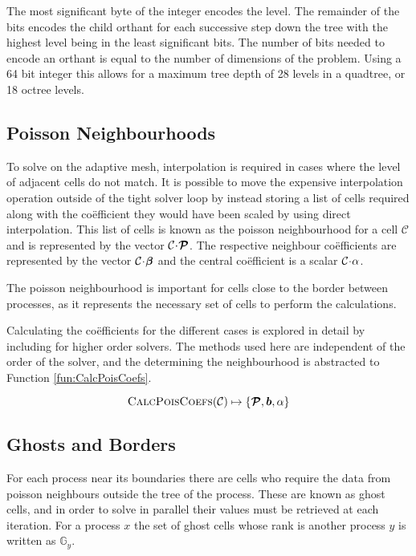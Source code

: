 \documentclass{IIBproject}
\newcommand{\vect}[1]{\bm{#1}}
\newcommand{\acc}{{\mkern 0.5mu\cdot\mkern 0.5mu}}
\begin{document}
The most significant byte of the integer encodes the level. The remainder of the bits encodes the child orthant for each successive step down the tree with the highest level being in the least significant bits. The number of bits needed to encode an orthant is equal to the number of dimensions of the problem. Using a 64 bit integer this allows for a maximum tree depth of 28 levels in a quadtree, or 18 octree levels. 


\subsection{Poisson Neighbourhoods}

To solve on the adaptive mesh, interpolation is required in cases where the level of adjacent cells do not match. It is possible to move the expensive interpolation operation outside of the tight solver loop by instead storing a list of cells required along with the co\"efficient they would have been scaled by using direct interpolation. This list of cells is known as the poisson neighbourhood for a cell $\mathcal{C}$ and is represented by the vector $\mathcal{C}\acc\vect{\mathcal{P}}$. The respective neighbour co\"efficients are represented by the vector $\mathcal{C}\acc\vect{\beta}$ and the central co\"efficient is a scalar $\mathcal{C}\acc\alpha$. 

The poisson neighbourhood is important for cells close to the border between processes, as it represents the necessary set of cells to perform the calculations. 

Calculating the co\"efficients for the different cases is explored in detail by \cite{Yung2010} including for higher order solvers. The methods used here are independent of the order of the solver, and the determining the neighbourhood is abstracted to Function \ref{fun:CalcPoisCoefs}. 

\begin{equation}
	\label{fun:CalcPoisCoefs}
	\textproc{CalcPoisCoefs}(\mathcal{C}) \mapsto \{ \vect{\mathcal{P}}, \vect{b}, \alpha \}
\end{equation}

\subsection{Ghosts and Borders}
\label{sec:ghostsandborders}

For each process near its boundaries there are cells who require the data from poisson neighbours outside the tree of the process. These are known as ghost cells, and in order to solve in parallel their values must be retrieved at each iteration. For a process $x$ the set of ghost cells whose rank is another process $y$ is written as $\mathbb{G}_y$. 
\end{document}

